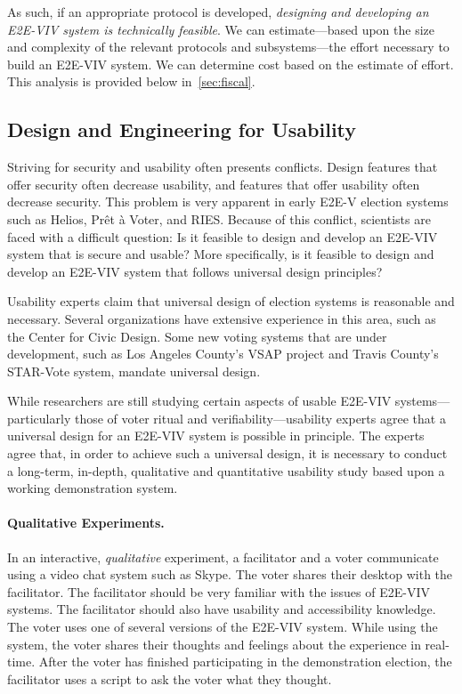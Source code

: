 As such, if an appropriate protocol is developed, \emph{designing and
  developing an E2E-VIV system is technically feasible}.  We can
estimate---based upon the size and complexity of the relevant
protocols and subsystems---the effort necessary to build an E2E-VIV
system.  We can determine cost based on the estimate of effort. This
analysis is provided below in~\autoref{sec:fiscal}.

\subsection{Design and Engineering for Usability}

Striving for security and usability often presents conflicts. Design
features that offer security often decrease usability, and features
that offer usability often decrease security. This problem is very
apparent in early E2E-V election systems such as Helios, Prêt à Voter,
and RIES. Because of this conflict, scientists are faced with a
difficult question: Is it feasible to design and develop an E2E-VIV
system that is secure and usable? More specifically, is it feasible to
design and develop an E2E-VIV system that follows universal design
principles?  

Usability experts claim that universal design of election systems is
reasonable and necessary. Several organizations have extensive
experience in this area, such as the Center for Civic Design. Some new
voting systems that are under development, such as Los Angeles
County's VSAP project and Travis County's STAR-Vote system, mandate
universal design. 

While researchers are still studying certain aspects of usable E2E-VIV
systems---particularly those of voter ritual and
verifiability---usability experts agree that a universal design for an
E2E-VIV system is possible in principle. The experts agree that, in
order to achieve such a universal design, it is necessary to conduct a
long-term, in-depth, qualitative and quantitative usability study
based upon a working demonstration system.

\paragraph{Qualitative Experiments.}
In an interactive, \emph{qualitative} experiment, a facilitator and a
voter communicate using a video chat system such as Skype. The voter
shares their desktop with the facilitator. The facilitator should be
very familiar with the issues of E2E-VIV systems. The facilitator
should also have usability and accessibility knowledge. The voter uses
one of several versions of the E2E-VIV system.  While using the
system, the voter shares their thoughts and feelings about the
experience in real-time. After the voter has finished participating in
the demonstration election, the facilitator uses a script to ask the
voter what they thought.

